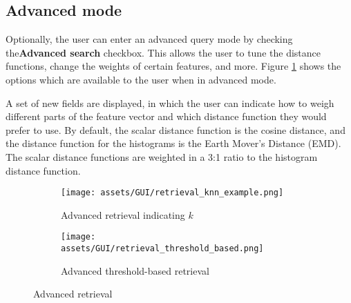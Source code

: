 \subsection{Advanced mode}
Optionally, the user can enter an advanced query mode by checking the\textbf{Advanced search} checkbox.
This allows the user to tune the distance functions, change the weights of certain features, and more.
Figure \ref{fig:gui-advanced-knn} shows the options which are available to the user when in advanced mode.

A set of new fields are displayed, in which the user can indicate how to weigh different parts of the feature
vector and which distance function they would prefer to use.
By default, the scalar distance function is the cosine distance, and the distance function for the histograms is the
Earth Mover's Distance (EMD).
The scalar distance functions are weighted in a 3:1 ratio to the histogram distance function.

\begin{figure}[H]
    \centering
    \begin{subfigure}[b]{0.45\textwidth} 
        \texttt{[image: assets/GUI/retrieval\_knn\_example.png]}
        \caption{Advanced retrieval indicating $k$}
        \label{fig:gui-advanced-knn}
    \end{subfigure}
    \hfill
    \begin{subfigure}[b]{0.45\textwidth} 
        \texttt{[image: assets/GUI/retrieval\_threshold\_based.png]}
        \caption{Advanced threshold-based retrieval}
        \label{fig:gui-advanced-threshold-based}
    \end{subfigure}
    \hfill
    
    \caption{Advanced retrieval}
    \label{fig:gui-advanced}
\end{figure}